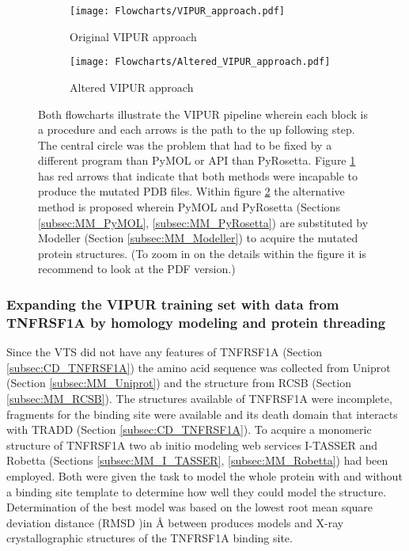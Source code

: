 	\begin{figure}[!ht]
		\centering
		\begin{subfigure}{0.45\textwidth}
			\texttt{[image: Flowcharts/VIPUR\_approach.pdf]}
			\caption{Original VIPUR approach}
			\label{fig:RES_VIPUR_approach}
		\end{subfigure}
		\begin{subfigure}{0.45\textwidth}
			\texttt{[image: Flowcharts/Altered\_VIPUR\_approach.pdf]}
			\caption{Altered VIPUR approach}
			\label{fig:RES_Altered_VIPUR_approach}
		\end{subfigure}
		\caption[Flowcharts VIPUR pipeline and altered VIPUR pipeline]{Both flowcharts illustrate the VIPUR pipeline wherein each block is a procedure and each arrows is the path to the up following step. 
			The central circle was the problem that had to be fixed by a different program than PyMOL or API than PyRosetta. Figure \ref{fig:RES_VIPUR_approach} has red arrows that indicate that both methods were incapable to produce the mutated PDB files. 
			Within figure \ref{fig:RES_Altered_VIPUR_approach} the alternative method is proposed wherein PyMOL and PyRosetta (Sections \ref{subsec:MM_PyMOL}, \ref{subsec:MM_PyRosetta}) are substituted by Modeller (Section \ref{subsec:MM_Modeller}) to acquire the mutated protein structures. (To zoom in on the details within the figure it is recommend to look at the PDF version.)}

		\label{fig:Flowcharts_of_old_and_altered_VIPUR}
	\end{figure}
	\label{subsubsec:RES_Incompatibility}
	\newpage
	
	\subsubsection{Expanding the VIPUR training set with data from TNFRSF1A by homology modeling and protein threading}
	Since the VTS did not have any features of TNFRSF1A (Section \ref{subsec:CD_TNFRSF1A}) the amino acid sequence was collected from Uniprot (Section \ref{subsec:MM_Uniprot}) and the structure from RCSB (Section \ref{subsec:MM_RCSB}). 
	The structures available of TNFRSF1A were incomplete, fragments for the binding site \cite{banner_crystal_1993} were available and its death domain that interacts with TRADD \cite{sukits_solution_2001} (Section \ref{subsec:CD_TNFRSF1A}). 
	To acquire a monomeric structure of TNFRSF1A two ab initio modeling web services I-TASSER and Robetta (Sections \ref{subsec:MM_I_TASSER}, \ref{subsec:MM_Robetta}) had been employed. 
	Both were given the task to model the whole protein with and without a binding site template to determine how well they could model the structure.
	Determination of the best model was based on the lowest root mean square deviation distance (RMSD )in {\AA} between produces models and X-ray crystallographic structures of the TNFRSF1A binding site.
	
